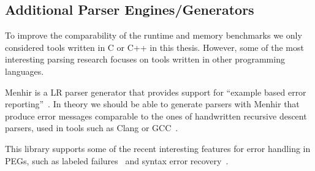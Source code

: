 \subsection{Additional Parser Engines/Generators}

To improve the comparability of the runtime and memory benchmarks we only considered tools written in C or C++ in this thesis. However, some of the most interesting parsing research focuses on tools written in other programming languages.

\begin{description}[style=multiline, leftmargin=3cm, font=\bfseries]
  \item [Menhir (OCaml)] Menhir is a LR parser generator that provides support for “example based error reporting”~\cite{jeffery2003generating, kaestner2018compcert, pottier2019menhir}. In theory we should be able to generate parsers with Menhir that produce error messages comparable to the ones of handwritten recursive descent parsers, used in tools such as Clang or GCC~\cite[p. 2]{kaestner2018compcert}.

  \item[LPegLabel (Lua)] This library supports some of the recent interesting features for error handling in \glspl{PEG}, such as labeled failures~\cite{maidl2016labeled} and syntax error recovery~\cite{medeiros2018recovery}.
\end{description}
